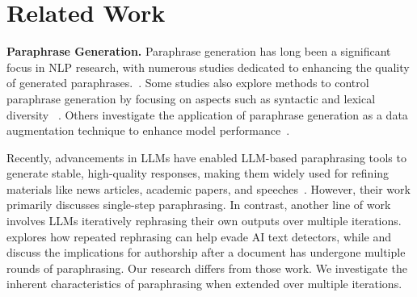 
\section{Related Work}

\textbf{Paraphrase Generation.}
Paraphrase generation has long been a significant focus in NLP research, with numerous studies dedicated to enhancing the quality of generated paraphrases.~\cite{li-etal-2018-paraphrase,roy-grangier-2019-unsupervised,lewis_pre-training_2020,lin-etal-2021-towards-document-level,hosking-etal-2022-hierarchical,xie-etal-2022-multi}.
Some studies also explore methods to control paraphrase generation by focusing on aspects such as syntactic and lexical diversity
~\cite{li-etal-2019-decomposable,goyal-durrett-2020-neural,huang_generating_2021,quality,dipper,yang-etal-2022-gcpg}.
Others investigate the application of paraphrase generation as a data augmentation technique to enhance model performance~\cite{jolly-etal-2020-data,bencke2024data,okur-etal-2022-data}.

Recently, advancements in LLMs have enabled LLM-based paraphrasing tools to generate stable, high-quality responses, making them widely used for refining materials like news articles, academic papers, and speeches~\cite{witteveen-andrews-2019-paraphrasing,roe2022automated,rani-etal-2023-factify}.
However, their work primarily discusses single-step paraphrasing.
In contrast, another line of work involves LLMs iteratively rephrasing their own outputs over multiple iterations. 
\citet{can_ai} explores how repeated rephrasing can help evade AI text detectors, while \citet{ship} and \citet{huang_authorship_2024} discuss the implications for authorship after a document has undergone multiple rounds of paraphrasing.
Our research differs from those work. 
We investigate the inherent characteristics of paraphrasing when extended over multiple iterations.


